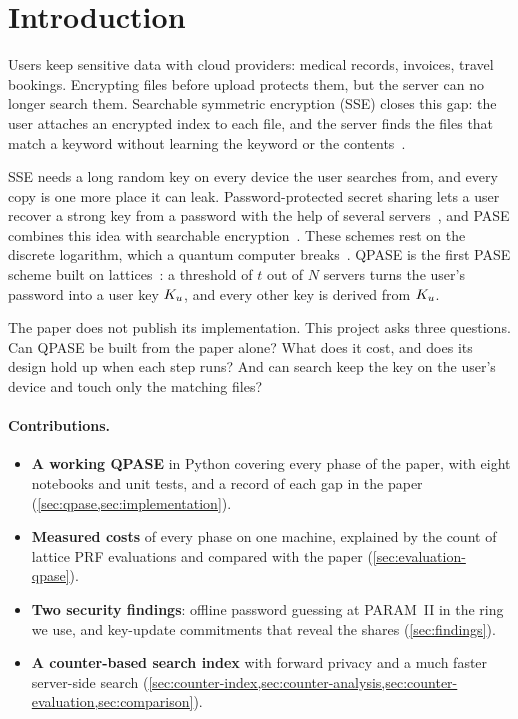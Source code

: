 \section{Introduction}
\label{sec:introduction}

Users keep sensitive data with cloud providers: medical records, invoices, travel bookings. Encrypting files before
upload protects them, but the server can no longer search them. Searchable symmetric encryption (SSE) closes this
gap: the user attaches an encrypted index to each file, and the server finds the files that match a keyword without
learning the keyword or the contents~\cite{song2000practical,curtmola2006sse}.

SSE needs a long random key on every device the user searches from, and every copy is one more place it can leak.
Password-protected secret sharing lets a user recover a strong key from a password with the help of several
servers~\cite{jarecki2016highly}, and PASE combines this idea with searchable encryption~\cite{chen2021pase}. These
schemes rest on the discrete logarithm, which a quantum computer breaks~\cite{shor1994}. QPASE is the first PASE
scheme built on lattices~\cite{jiang2024qpase}: a threshold of $t$ out of $N$ servers turns the user's password into
a user key $K_u$, and every other key is derived from $K_u$.

The paper does not publish its implementation. This project asks three questions. Can QPASE be built from the paper
alone? What does it cost, and does its design hold up when each step runs? And can search keep the key on the
user's device and touch only the matching files?

\paragraph{Contributions.}
\begin{itemize}
  \item \textbf{A working QPASE} in Python covering every phase of the paper, with eight notebooks and \UnitTests{}
        unit tests, and a record of each gap in the paper (\cref{sec:qpase,sec:implementation}).
  \item \textbf{Measured costs} of every phase on one machine, explained by the count of lattice PRF evaluations
        and compared with the paper (\cref{sec:evaluation-qpase}).
  \item \textbf{Two security findings}: offline password guessing at PARAM~II in the ring we use, and key-update
        commitments that reveal the shares (\cref{sec:findings}).
  \item \textbf{A counter-based search index} with forward privacy and a much faster server-side search
        (\cref{sec:counter-index,sec:counter-analysis,sec:counter-evaluation,sec:comparison}).
\end{itemize}
